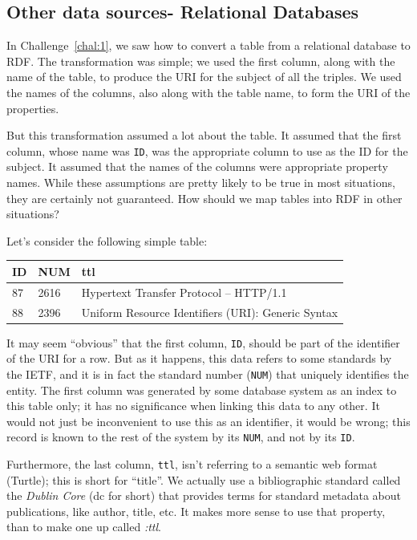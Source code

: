 \subsection{Other data sources- Relational Databases}

In Challenge~\ref{chal:1}, we saw how to convert a table from a relational
database to RDF. The transformation was simple; we used the first column, along
with the name of the table, to produce the URI for the subject of all the 
triples.  We used the names of the columns, also along with the table 
name, to form the URI of the properties.

But this transformation assumed a lot about the table.  It assumed that the
first column, whose name was \texttt{ID}, was the appropriate column to use
as the ID for the subject.  It assumed that the names of the columns were
appropriate property names.  While these assumptions are pretty likely to 
be true in most situations, they are certainly not guaranteed.  How should we
map tables into RDF in other situations? 

Let's consider the following simple table:

\phantom{I}

\begin{tabular}{|lll|}
\hline
ID&NUM &ttl \\
\hline
\hline
87&2616&Hypertext Transfer Protocol -- HTTP/1.1 \\
88&2396&Uniform Resource Identifiers (URI): Generic Syntax\\
     \hline
\end{tabular}

It may seem ``obvious'' that the first column, \texttt{ID}, should be part
of the identifier of the URI for a row.  But as it happens, this data refers to
some standards by the IETF, and it is in fact the standard number (\texttt{NUM}) that 
uniquely  identifies the entity.   The first column was generated by some database
system as an index to this table only; it has no significance when linking this data
to any other.  It would not just be inconvenient to use this as an identifier, it would be
wrong; this record is known to the rest of the system by its \texttt{NUM}, 
and not by its \texttt{ID}.

Furthermore, the last column, \texttt{ttl}, isn't referring to a semantic web format (Turtle);
this is short for ``title''.  We actually use a bibliographic standard called 
the \emph{Dublin Core} (dc for short) that provides terms for standard metadata about
publications, like author, title, etc.  It makes more sense to use that property, than to
make one up called \emph{:ttl}.  

